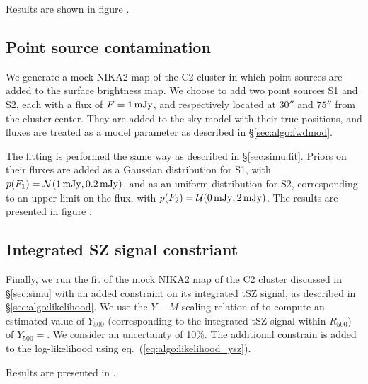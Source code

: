 Results are shown in figure \todo.

\subsection{Point source contamination} \label{sec:simu:ps}

We generate a mock NIKA2 map of the C2 cluster in which point sources are added to the surface brightness map.
We choose to add two point sources S1 and S2, each with a flux of $F = 1 \, {\rm mJy}$, and respectively located at $30''$ and $75''$ from the cluster center.
They are added to the sky model with their true positions, and fluxes are treated as a model parameter as described in \S\ref{sec:algo:fwdmod}.

The fitting is performed the same way as described in \S\ref{sec:simu:fit}.
Priors on their fluxes are added as a Gaussian distribution for S1, with $p(F_1) = \mathcal{N}(1 \,{\rm mJy}, 0.2 \,{\rm mJy})$, and as an uniform distribution for S2, corresponding to an upper limit on the flux, with $p(F_2) = \mathcal{U}(0 \,{\rm mJy}, 2 \,{\rm mJy})$.
The results are presented in figure \todo.

\subsection{Integrated SZ signal constriant} \label{sec:simu:Ysz}

Finally, we run the fit of the mock NIKA2 map of the C2 cluster discussed in \S\ref{sec:simu} with an added constraint on its integrated tSZ signal, as described in \S\ref{sec:algo:likelihood}.
We use the $Y-M$ scaling relation of \citet{arnaud_universal_2010} to compute an estimated value of $Y_{500}$ (corresponding to the integrated tSZ signal within $R_{500}$) of $Y_{500} =$\todo.
We consider an uncertainty of 10\%.
The additional constrain is added to the log-likelihood using eq.~(\ref{eq:algo:likelihood_ysz}).

Results are presented in \todo.